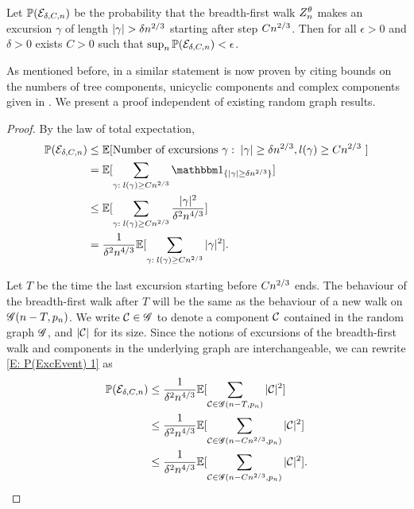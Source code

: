 \begin{lemma} \label{L: late excursions}
	Let 
	$\mathbb{P}(\mathcal{E}_{\delta, C, n})$ 
	be the probability that the breadth-first walk $Z_n^{\theta}$ makes an excursion $\gamma$ of length 
	$|\gamma| > \delta n^{2 / 3}$ starting after step $Cn^{2 / 3}$.
	Then for all $\epsilon>0$ and $\delta > 0$ exists $C>0$ such that $\sup_n \mathbb{P}(\mathcal{E}_{\delta, C, n}) < \epsilon$. 
\end{lemma}
\begin{note}
	As mentioned before, in \cite{Aldous.1997} a similar statement is now proven
	by citing bounds on the numbers of tree components, unicyclic components and complex components
	given in \cite{Luczak.1994}.
	We present a proof independent of existing random graph results.
\end{note}

\begin{proof}
	By the law of total expectation,
	\begin{equation} \label{E: P(ExcEvent) 1}
	\begin{aligned}
	\Prob(\ExcursionEvent) 
	&\leq \Exp{ \text{Number of excursions $\gamma: \; |\gamma| \geq \delta\n{2}{3},l(\gamma) \geq C\n{2}{3}$ } } \\
	&= \Exp{ \sum_{\gamma: \; l(\gamma) \geq C\n{2}{3}} \Ind{\{|\gamma| \geq \delta\n{2}{3} \} } } \\
	&\leq \Exp{ \sum_{\gamma: \; l(\gamma) \geq C\n{2}{3}} \frac{|\gamma|^2}{\delta^2\n{4}{3}} } \\
	&= \frac{1}{\delta^2\n{4}{3}} \Exp{ \sum_{\gamma: \; l(\gamma) \geq C\n{2}{3}}  |\gamma|^2 }.
	\end{aligned}
	\end{equation}
	
	Let $T$ be the time the last excursion starting before $Cn^{2 / 3}$ ends.
	The behaviour of the breadth-first walk after $T$ will be the same as the behaviour of a new walk on $\mathscr{G}(n-T, p_n)$.
	We write $\mathcal{C} \in \mathscr{G}$ to denote a component $\mathcal{C}$ contained in the random graph $\mathscr{G}$,
	and $|\mathcal{C}|$ for its size.
	Since the notions of excursions of the breadth-first walk and components in the underlying graph are interchangeable,
	we can rewrite \eqref{E: P(ExcEvent) 1} as
	\begin{equation} \label{E: P(ExcEvent) 2}
	\begin{aligned}
	\mathbb{P}(\mathcal{E}_{\delta, C, n}) 
	&\leq \frac{1}{\delta^2n^{4 / 3}} \mathbb{E}[ \sum_{\mathcal{C} \in \mathscr{G}(n-T, p_n)}  |\mathcal{C}|^2  ] \\
	&\leq \frac{1}{\delta^2n^{4 / 3}} \mathbb{E}[ \sum_{\mathcal{C} \in \mathscr{G}(n-Cn^{2 / 3}, p_n)}  |\mathcal{C}|^2  ] \\
	&\leq \frac{1}{\delta^2n^{4 / 3}} \mathbb{E}[ \sum_{\mathcal{C} \in \mathscr{G}(n-Cn^{2 / 3}, p_n)}  |\mathcal{C}|^2 ].
	\end{aligned}
	\end{equation}
	

\end{proof}
